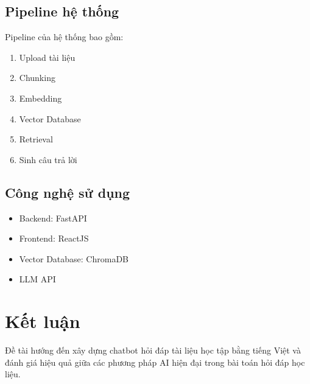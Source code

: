 \documentclass[12pt,a4paper]{report}
\begin{document}
	\section{Pipeline hệ thống}
	
	Pipeline của hệ thống bao gồm:
	\begin{enumerate}
		\item Upload tài liệu
		\item Chunking
		\item Embedding
		\item Vector Database
		\item Retrieval
		\item Sinh câu trả lời
	\end{enumerate}
	
	\section{Công nghệ sử dụng}
	
	\begin{itemize}
		\item Backend: FastAPI
		\item Frontend: ReactJS
		\item Vector Database: ChromaDB
		\item LLM API
	\end{itemize}
	
	\chapter{Kết luận}
	
	Đề tài hướng đến xây dựng chatbot hỏi đáp tài liệu học tập bằng tiếng Việt và đánh giá hiệu quả giữa các phương pháp AI hiện đại trong bài toán hỏi đáp học liệu.
	
\end{document}
